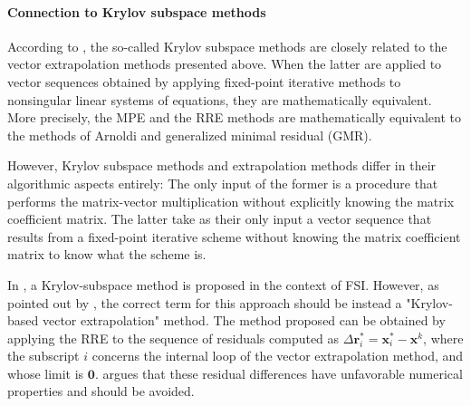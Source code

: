 \paragraph{Connection to Krylov subspace methods}

According to \cite{sidi_vector_2017}, the so-called Krylov subspace methods are closely related to the vector extrapolation methods presented above.
When the latter are applied to vector sequences obtained by applying fixed-point iterative methods to nonsingular linear systems of equations, they are mathematically equivalent.
More precisely, the MPE and the RRE methods are mathematically equivalent to the methods of Arnoldi and generalized minimal residual (GMR).

However, Krylov subspace methods and extrapolation methods differ in their algorithmic aspects entirely:
The only input of the former is a procedure that performs the matrix-vector multiplication without explicitly knowing the matrix coefficient matrix.
The latter take as their only input a vector sequence that results from a fixed-point iterative scheme without knowing the matrix coefficient matrix to know what the scheme is.


In \cite{michler_interface_2005}, a Krylov-subspace method is proposed in the context of FSI.
However, as pointed out by \cite{kuttler_vector_2009}, the correct term for this approach should be instead a "Krylov-based vector extrapolation" method.
The method proposed can be obtained by applying the RRE to the sequence of residuals computed as
\(\Delta \mathbf r^*_i = \mathbf x^*_i - \mathbf x^k\), where the subscript \(i\) concerns the internal loop of the vector extrapolation method, and whose limit is \(\mathbf 0\).
\cite{kuttler_vector_2009} argues that these residual differences have unfavorable numerical properties and should be avoided.

